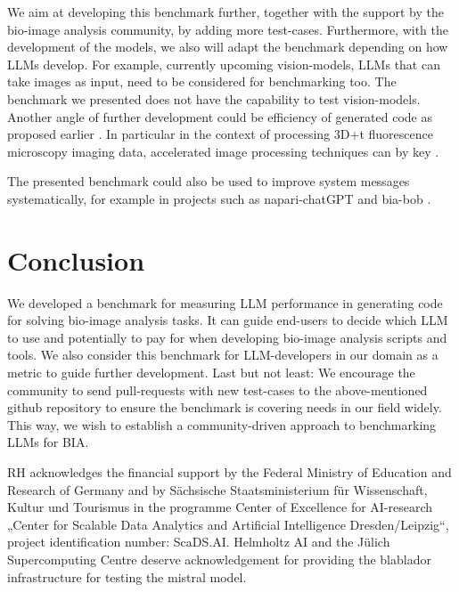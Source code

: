 \documentclass{ecai}
\begin{document}
We aim at developing this benchmark further, together with the support by the bio-image analysis community, by adding more test-cases. Furthermore, with the development of the models, we also will adapt the benchmark depending on how LLMs develop. For example, currently upcoming vision-models, LLMs that can take images as input, need to be considered for benchmarking too. The benchmark we presented does not have the capability to test vision-models. Another angle of further development could be efficiency of generated code as proposed earlier \citep{du2024mercury}. In particular in the context of processing 3D+t fluorescence microscopy imaging data, accelerated image processing techniques can by key \citep{Haase2020}. 
\begin{blind}
The presented benchmark could also be used to improve system messages systematically, for example in projects such as napari-chatGPT \citep{royer2023omega} and bia-bob \citep{haase2024biaBob}.
\end{blind}


\section{Conclusion}

We developed a benchmark for measuring LLM performance in generating code for solving bio-image analysis tasks. It can guide end-users to decide which LLM to use and potentially to pay for when developing bio-image analysis scripts and tools. We also consider this benchmark for LLM-developers in our domain as a metric to guide further development. Last but not least: We encourage the community to send pull-requests with new test-cases to the above-mentioned github repository to ensure the benchmark is covering needs in our field widely. This way, we wish to establish a community-driven approach to benchmarking LLMs for BIA. 




\begin{ack}
RH acknowledges the financial support by the Federal Ministry of Education and Research of Germany and by Sächsische Staatsministerium für Wissenschaft, Kultur und Tourismus in the programme Center of Excellence for AI-research „Center for Scalable Data Analytics and Artificial Intelligence Dresden/Leipzig“, project identification number: ScaDS.AI.
Helmholtz AI and the Jülich Supercomputing Centre deserve acknowledgement for providing the blablador infrastructure for testing the mistral model.

\end{ack}




\end{document}
